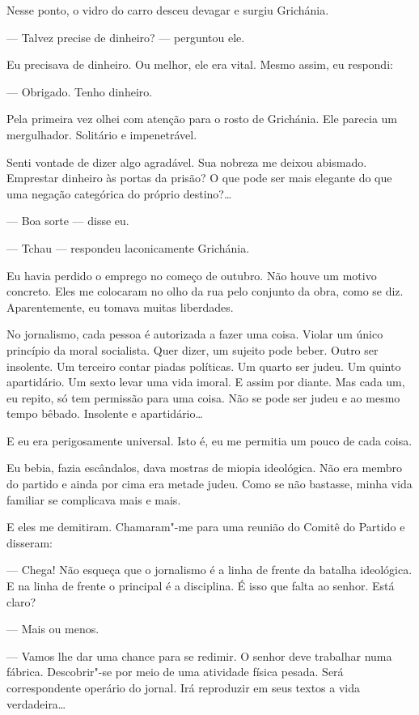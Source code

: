 Nesse ponto, o vidro do carro desceu devagar e surgiu Grichánia.

--- Talvez precise de dinheiro? --- perguntou ele.

Eu precisava de dinheiro. Ou melhor, ele era vital. Mesmo assim, eu
respondi:

--- Obrigado. Tenho dinheiro.

Pela primeira vez olhei com atenção para o rosto de Grichánia. Ele
parecia um mergulhador. Solitário e impenetrável.

Senti vontade de dizer algo agradável. Sua nobreza me deixou abismado.
Emprestar dinheiro às portas da prisão? O que pode ser mais elegante do
que uma negação categórica do próprio destino?\ldots{}

--- Boa sorte --- disse eu.

--- Tchau --- respondeu laconicamente Grichánia.

Eu havia perdido o emprego no começo de outubro. Não houve um motivo
concreto. Eles me colocaram no olho da rua pelo conjunto da obra, como
se diz. Aparentemente, eu tomava muitas liberdades.

No jornalismo, cada pessoa é autorizada a fazer uma coisa. Violar um \label{ref2}
único princípio da moral socialista. Quer dizer, um sujeito pode beber.
Outro ser insolente. Um terceiro contar piadas políticas. Um quarto ser
judeu. Um quinto apartidário. Um sexto levar uma vida imoral. E assim
por diante. Mas cada um, eu repito, só tem permissão para uma coisa. Não
se pode ser judeu e ao mesmo tempo bêbado. Insolente e apartidário\ldots{}

E eu era perigosamente universal. Isto é, eu me permitia um pouco de
cada coisa.

Eu bebia, fazia escândalos, dava mostras de miopia ideológica. Não era
membro do partido e ainda por cima era metade judeu. Como se não
bastasse, minha vida familiar se complicava mais e mais.

E eles me demitiram. Chamaram"-me para uma reunião do Comitê do Partido e
disseram:

--- Chega! Não esqueça que o jornalismo é a linha de frente da batalha
ideológica. E na linha de frente o principal é a disciplina. É isso que
falta ao senhor. Está claro?

--- Mais ou menos.

--- Vamos lhe dar uma chance para se redimir. O senhor deve trabalhar
numa fábrica. Descobrir"-se por meio de uma atividade física pesada. Será
correspondente operário do jornal. Irá reproduzir em seus textos a vida
verdadeira\ldots{}

